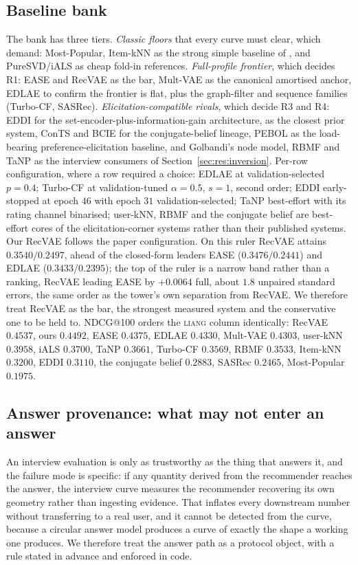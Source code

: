 \documentclass[acmsmall,review,anonymous]{acmart}
\begin{document}
\subsection{Baseline bank}
The bank has three tiers. \emph{Classic floors} that every curve must clear, which \citet{dacrema2019progress} demand: Most-Popular, Item-kNN as the strong simple baseline of \citet{cremonesi2010performance}, and PureSVD/iALS as cheap fold-in references. \emph{Full-profile frontier}, which decides R1: EASE and RecVAE as the bar, Mult-VAE as the canonical amortised anchor, EDLAE to confirm the frontier is flat, plus the graph-filter and sequence families (Turbo-CF, SASRec). \emph{Elicitation-compatible rivals}, which decide R3 and R4: EDDI for the set-encoder-plus-information-gain architecture, \citet{biyik2023soft} as the closest prior system, ConTS and BCIE for the conjugate-belief lineage, PEBOL as the load-bearing preference-elicitation baseline, and Golbandi's node model, RBMF and TaNP as the interview consumers of Section~\ref{sec:res:inversion}. Per-row configuration, where a row required a choice: EDLAE at validation-selected $p{=}0.4$; Turbo-CF at validation-tuned $\alpha{=}0.5$, $s{=}1$, second order; EDDI early-stopped at epoch $46$ with epoch $31$ validation-selected; TaNP best-effort with its rating channel binarised; user-kNN, RBMF and the conjugate belief are best-effort cores of the elicitation-corner systems rather than their published systems. Our RecVAE follows the paper configuration. On this ruler RecVAE attains $0.3540/0.2497$, ahead of the closed-form leaders EASE ($0.3476/0.2441$) and EDLAE ($0.3433/0.2395$); the top of the ruler is a narrow band rather than a ranking, RecVAE leading EASE by $+0.0064$ full, about $1.8$ unpaired standard errors, the same order as the tower's own separation from RecVAE. We therefore treat RecVAE as the bar, the strongest measured system and the conservative one to be held to. NDCG@100 orders the \textsc{liang} column identically: RecVAE $0.4537$, ours $0.4492$, EASE $0.4375$, EDLAE $0.4330$, Mult-VAE $0.4303$, user-kNN $0.3958$, iALS $0.3700$, TaNP $0.3661$, Turbo-CF $0.3569$, RBMF $0.3533$, Item-kNN $0.3200$, EDDI $0.3110$, the conjugate belief $0.2883$, SASRec $0.2465$, Most-Popular $0.1975$.

\subsection{Answer provenance: what may not enter an answer}\label{sec:provenance}
An interview evaluation is only as trustworthy as the thing that answers it, and the failure mode is specific: if any quantity derived from the recommender reaches the answer, the interview curve measures the recommender recovering its own geometry rather than ingesting evidence. That inflates every downstream number without transferring to a real user, and it cannot be detected from the curve, because a circular answer model produces a curve of exactly the shape a working one produces. We therefore treat the answer path as a protocol object, with a rule stated in advance and enforced in code.
\end{document}
